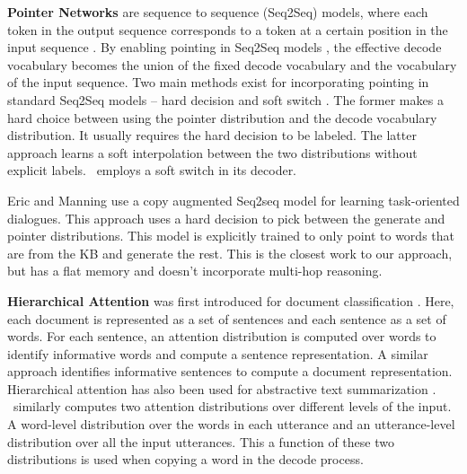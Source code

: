 \vspace{0.5ex}
\noindent\textbf{Pointer Networks} are sequence to sequence (Seq2Seq) models, where each token in the output sequence corresponds to a token at a certain position in the input sequence \cite{vinyals2015pointer}. By enabling pointing in Seq2Seq models \cite{cho2014learning,sutskever2014sequence}, the effective decode vocabulary becomes the union of the fixed decode vocabulary and the vocabulary of the input sequence. Two main methods \cite{gu2016incorporating,eric2017copy} exist for incorporating pointing in standard Seq2Seq models -- hard decision \cite{nallapati2016abstractive,gu2016incorporating,eric2017copy} and soft switch \cite{see2017get}. The former makes a hard choice between using the pointer distribution and the decode vocabulary distribution. It usually requires the hard decision to be labeled. The latter approach learns a soft interpolation between the two distributions without explicit labels. \sys\ employs a soft switch in its decoder.


Eric and Manning
\cite{eric2017copy} use a copy augmented Seq2seq model for learning task-oriented dialogues. This approach uses a hard decision to pick between the generate and pointer distributions. This model is explicitly trained to only point to words that are from the KB and generate the rest. This is the closest work to our approach, but has a flat memory and doesn't incorporate multi-hop reasoning.

\vspace{0.5ex}
\noindent\textbf{Hierarchical Attention} was first introduced for document classification \cite{yang2016hierarchical}. Here, each document is represented as a set of sentences and each sentence as a set of words. For each sentence, an attention distribution is computed over words to identify informative words and compute a sentence representation. A similar approach identifies informative sentences to compute a document representation. Hierarchical attention has also been used for abstractive text summarization \cite{nallapati2016abstractive}.
\sys\ similarly computes two attention distributions over different levels of the input. A word-level distribution over the words in each utterance and an utterance-level distribution over all the input utterances. This a function of these two distributions is used when copying a word in the decode process.


